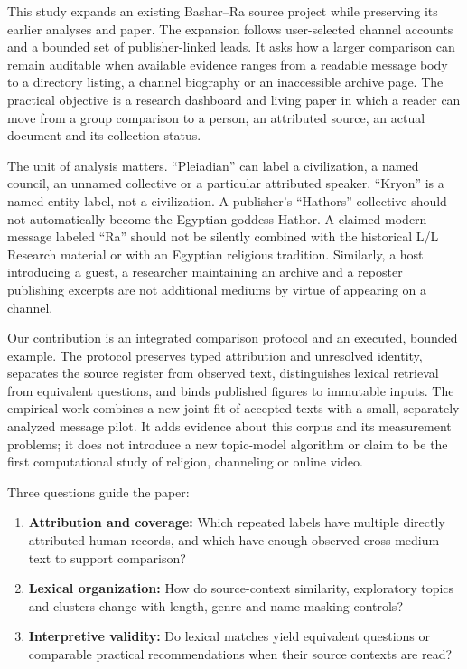 \documentclass[
  11pt,
]{article}
\providecommand{\tightlist}{%
  \setlength{\itemsep}{0pt}\setlength{\parskip}{0pt}}
\begin{document}
This study expands an existing Bashar--Ra source project while
preserving its earlier analyses and paper. The expansion follows
user-selected channel accounts and a bounded set of publisher-linked
leads. It asks how a larger comparison can remain auditable when
available evidence ranges from a readable message body to a directory
listing, a channel biography or an inaccessible archive page. The
practical objective is a research dashboard and living paper in which a
reader can move from a group comparison to a person, an attributed
source, an actual document and its collection status.

The unit of analysis matters. ``Pleiadian'' can label a civilization, a
named council, an unnamed collective or a particular attributed speaker.
``Kryon'' is a named entity label, not a civilization. A publisher's
``Hathors'' collective should not automatically become the Egyptian
goddess Hathor. A claimed modern message labeled ``Ra'' should not be
silently combined with the historical L/L Research material or with an
Egyptian religious tradition. Similarly, a host introducing a guest, a
researcher maintaining an archive and a reposter publishing excerpts are
not additional mediums by virtue of appearing on a channel.

Our contribution is an integrated comparison protocol and an executed,
bounded example. The protocol preserves typed attribution and unresolved
identity, separates the source register from observed text,
distinguishes lexical retrieval from equivalent questions, and binds
published figures to immutable inputs. The empirical work combines a new
joint fit of accepted texts with a small, separately analyzed message
pilot. It adds evidence about this corpus and its measurement problems;
it does not introduce a new topic-model algorithm or claim to be the
first computational study of religion, channeling or online video.

Three questions guide the paper:

\begin{enumerate}
\def\labelenumi{\arabic{enumi}.}
\tightlist
\item
  \textbf{Attribution and coverage:} Which repeated labels have multiple
  directly attributed human records, and which have enough observed
  cross-medium text to support comparison?
\item
  \textbf{Lexical organization:} How do source-context similarity,
  exploratory topics and clusters change with length, genre and
  name-masking controls?
\item
  \textbf{Interpretive validity:} Do lexical matches yield equivalent
  questions or comparable practical recommendations when their source
  contexts are read?
\end{enumerate}
\end{document}
